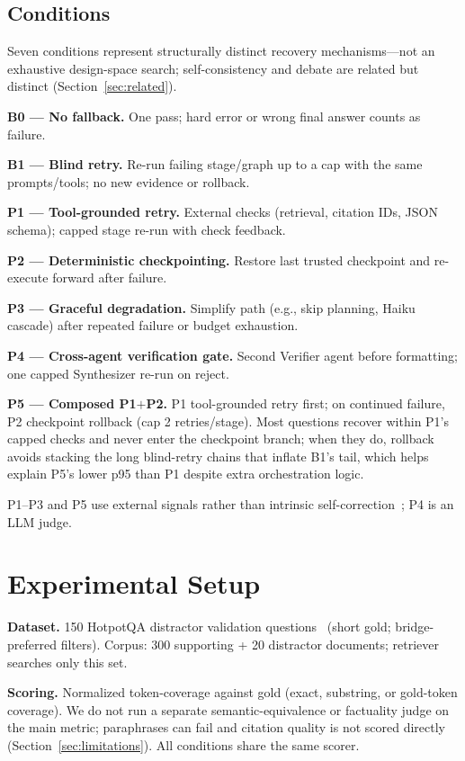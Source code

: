 \documentclass{article}
\begin{document}
\subsection{Conditions}
Seven conditions represent structurally distinct recovery mechanisms---not an exhaustive design-space search; self-consistency and debate are related but distinct (Section~\ref{sec:related}).

\textbf{B0 --- No fallback.} One pass; hard error or wrong final answer counts as failure.

\textbf{B1 --- Blind retry.} Re-run failing stage/graph up to a cap with the same prompts/tools; no new evidence or rollback.

\textbf{P1 --- Tool-grounded retry.} External checks (retrieval, citation IDs, JSON schema); capped stage re-run with check feedback.

\textbf{P2 --- Deterministic checkpointing.} Restore last trusted checkpoint and re-execute forward after failure.

\textbf{P3 --- Graceful degradation.} Simplify path (e.g., skip planning, Haiku cascade) after repeated failure or budget exhaustion.

\textbf{P4 --- Cross-agent verification gate.} Second Verifier agent before formatting; one capped Synthesizer re-run on reject.

\textbf{P5 --- Composed P1$+$P2.} P1 tool-grounded retry first; on continued failure, P2 checkpoint rollback (cap 2 retries/stage). Most questions recover within P1's capped checks and never enter the checkpoint branch; when they do, rollback avoids stacking the long blind-retry chains that inflate B1's tail, which helps explain P5's lower p95 than P1 despite extra orchestration logic.

P1--P3 and P5 use external signals rather than intrinsic self-correction~\citep{huang2024cannot,kamoi2024survey}; P4 is an LLM judge.

\section{Experimental Setup}
\label{sec:setup}

\textbf{Dataset.} 150 HotpotQA distractor validation questions~\citep{yang2018hotpotqa} (short gold; bridge-preferred filters). Corpus: 300 supporting + 20 distractor documents; retriever searches only this set.

\textbf{Scoring.} Normalized token-coverage against gold (exact, substring, or gold-token coverage). We do not run a separate semantic-equivalence or factuality judge on the main metric; paraphrases can fail and citation quality is not scored directly (Section~\ref{sec:limitations}). All conditions share the same scorer.
\end{document}
